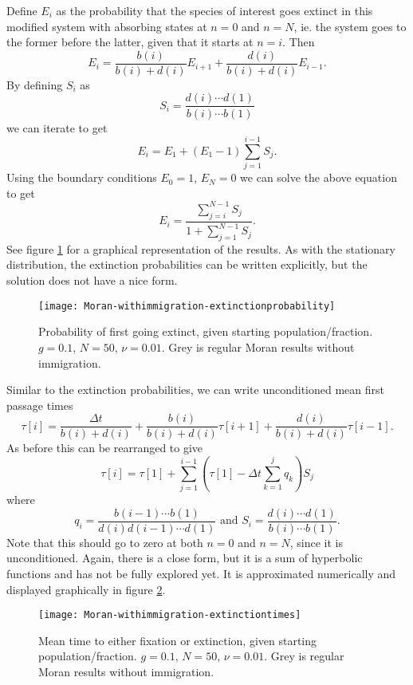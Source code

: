 Define $E_i$ as the probability that the species of interest goes extinct in this modified system with absorbing states at $n=0$ and $n=N$, ie. the system goes to the former before the latter, given that it starts at $n=i$. 
Then
\begin{equation}
E_i = \frac{b(i)}{b(i)+d(i)}E_{i+1} + \frac{d(i)}{b(i)+d(i)}E_{i-1}. 
\end{equation}
By defining $S_i$ as
\begin{equation}
S_i = \frac{d(i)\cdots d(1)}{b(i)\cdots b(1)}
\end{equation}
we can iterate to get
\begin{equation}
E_{i} = E_1 + (E_1-1)\sum_{j=1}^{i-1}S_j. 
\end{equation}
Using the boundary conditions $E_0 = 1$, $E_N = 0$ we can solve the above equation to get
\begin{equation} \label{extnprob}
E_{i} = \frac{\sum_{j=i}^{N-1}S_j}{1+\sum_{j=1}^{N-1}S_j}. 
\end{equation}
See figure \ref{extnprobfig} for a graphical representation of the results. 
As with the stationary distribution, the extinction probabilities can be written explicitly, but the solution does not have a nice form. 
\begin{figure}[ht]
	\centering
	\texttt{[image: Moran-withimmigration-extinctionprobability]}
	\caption{Probability of first going extinct, given starting population/fraction. $g=0.1$, $N=50$, $\nu=0.01$. Grey is regular Moran results without immigration. } \label{extnprobfig}
\end{figure}

Similar to the extinction probabilities, we can write unconditioned mean first passage times
\begin{equation}
\tau[i] = \frac{\Delta t}{b(i)+d(i)} + \frac{b(i)}{b(i)+d(i)}\tau[i+1] + \frac{d(i)}{b(i)+d(i)}\tau[i-1]. 
\end{equation}
As before this can be rearranged to give
\begin{equation}
\tau[i] = \tau[1] + \sum_{j=1}^{i-1}\left(\tau[1] - \Delta t\sum_{k=1}^{j}q_k\right)S_{j}
\end{equation}
where
\begin{equation*}
q_i = \frac{b(i-1)\cdots b(1)}{d(i)d(i-1)\cdots d(1)} \text{  and  } S_i = \frac{d(i)\cdots d(1)}{b(i)\cdots b(1)}. 
\end{equation*}
Note that this should go to zero at both $n=0$ and $n=N$, since it is unconditioned. 
Again, there is a close form, but it is a sum of hyperbolic functions and has not be fully explored yet. 
It is approximated numerically and displayed graphically in figure \ref{extntimefig}. 
\begin{figure}[ht]
	\centering
	\texttt{[image: Moran-withimmigration-extinctiontimes]}
	\caption{Mean time to either fixation or extinction, given starting population/fraction. $g=0.1$, $N=50$, $\nu=0.01$. Grey is regular Moran results without immigration. } \label{extntimefig}
\end{figure}

